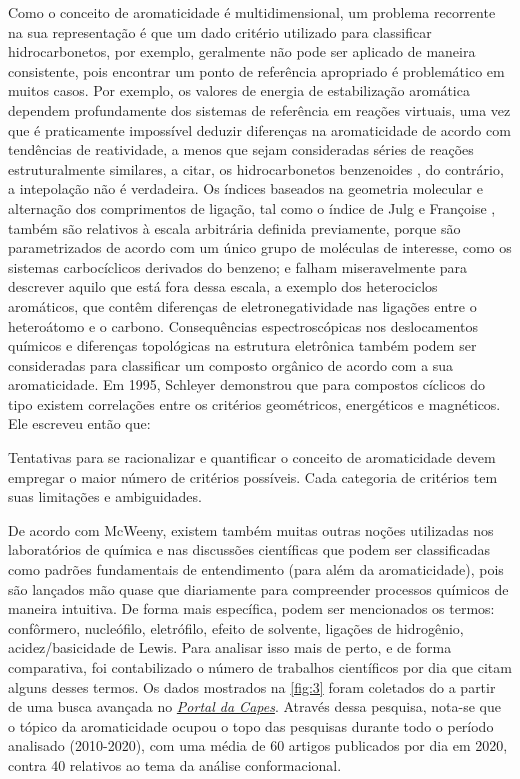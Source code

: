 Como o conceito de aromaticidade é multidimensional, um problema recorrente na sua representação é que um dado critério utilizado para classificar hidrocarbonetos, por exemplo, geralmente não pode ser aplicado de maneira consistente, pois encontrar um ponto de referência apropriado é problemático em muitos casos. Por exemplo, os valores de energia de estabilização aromática dependem profundamente dos sistemas de referência em reações virtuais, uma vez que é praticamente impossível deduzir diferenças na aromaticidade de acordo com tendências de reatividade, a menos que sejam consideradas séries de reações estruturalmente similares, a citar, os hidrocarbonetos benzenoides \autocite{Ciesielski2009, Krygowski2014}, do contrário, a intepolação não é verdadeira. Os índices baseados na geometria molecular e alternação dos comprimentos de ligação, tal como o índice de Julg e Françoise \autocite{Julg1967}, também são relativos à escala arbitrária definida previamente, porque são parametrizados de acordo com um único grupo de moléculas de interesse, como os sistemas carbocíclicos derivados do benzeno; e falham miseravelmente para descrever aquilo que está fora dessa escala, a exemplo dos heterociclos aromáticos, que contêm diferenças de eletronegatividade nas ligações entre o heteroátomo e o carbono. Consequências espectroscópicas nos deslocamentos químicos e diferenças topológicas na estrutura eletrônica também podem ser consideradas para classificar um composto orgânico de acordo com a sua aromaticidade. Em 1995, Schleyer \autocite{Schleyer1996} demonstrou que para compostos cíclicos do tipo  existem correlações entre os critérios geométricos, energéticos e magnéticos. Ele escreveu então que:

\begin{citacao}
Tentativas para se racionalizar e quantificar o conceito de aromaticidade devem empregar o maior número de critérios possíveis. Cada categoria de critérios tem suas limitações e ambiguidades\autocite{Schleyer1996}.
\end{citacao}

De acordo com McWeeny, existem também muitas outras noções utilizadas nos laboratórios de química e nas discussões científicas que podem ser classificadas como padrões fundamentais de entendimento (para além da aromaticidade), pois são lançados mão quase que diariamente para compreender processos químicos de maneira intuitiva. De forma mais específica, podem ser mencionados os termos: confôrmero, nucleófilo, eletrófilo, efeito de solvente, ligações de hidrogênio, acidez/basicidade de Lewis. Para analisar isso mais de perto, e de forma comparativa, foi contabilizado o número de trabalhos científicos por dia que citam alguns desses termos. Os dados mostrados na \autoref{fig:3} foram coletados do a partir de uma busca avançada no \href{https://www-periodicos-capes-gov-br.ez46.periodicos.capes.gov.br/index.php?}{\textit{Portal da Capes}}. Através dessa pesquisa, nota-se que o tópico da aromaticidade ocupou o topo das pesquisas durante todo o período analisado (2010-2020), com uma média de 60 artigos publicados por dia em 2020, contra 40 relativos ao tema da análise conformacional.

